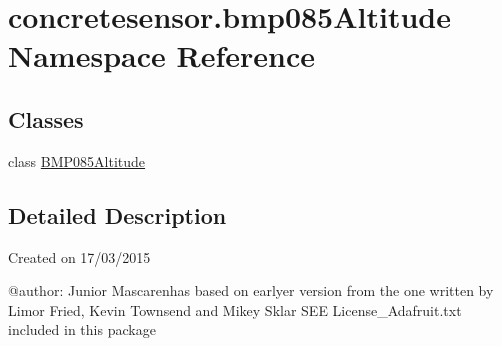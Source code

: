 \hypertarget{namespaceconcretesensor_1_1bmp085Altitude}{}\section{concretesensor.\+bmp085\+Altitude Namespace Reference}
\label{namespaceconcretesensor_1_1bmp085Altitude}
\subsection*{Classes}
\begin{DoxyCompactItemize}
\item 
class \hyperlink{classconcretesensor_1_1bmp085Altitude_1_1BMP085Altitude}{B\+M\+P085\+Altitude}
\end{DoxyCompactItemize}


\subsection{Detailed Description}
\begin{DoxyVerb}Created on 17/03/2015

@author: Junior Mascarenhas
based on earlyer version from
the one written by Limor Fried, Kevin Townsend and Mikey Sklar
SEE License_Adafruit.txt included in this package
\end{DoxyVerb}
 